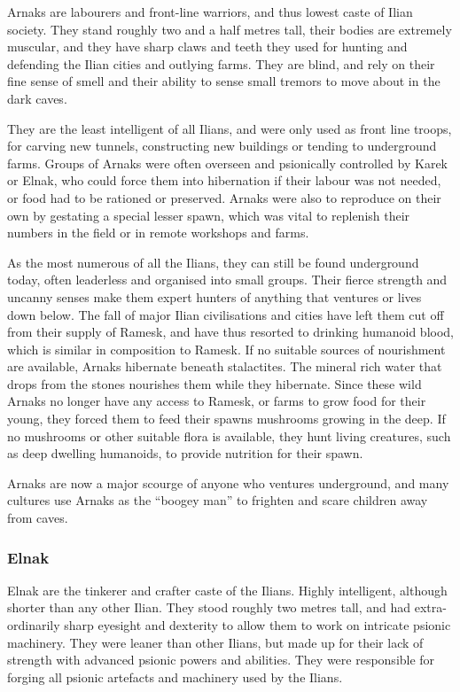 Arnaks are labourers and front-line warriors, and thus lowest caste of Ilian
society. They stand roughly two and a half metres tall, their bodies are
extremely muscular, and they have sharp claws and teeth they used for hunting
and defending the Ilian cities and outlying farms. They are blind, and rely on
their fine sense of smell and their ability to sense small tremors to move
about in the dark caves.

They are the least intelligent of all Ilians, and were only used as front line
troops, for carving new tunnels, constructing new buildings or tending to
underground farms. Groups of Arnaks were often overseen and psionically
controlled by Karek or Elnak, who could force them into hibernation if their
labour was not needed, or food had to be rationed or preserved. Arnaks were
also to reproduce on their own by gestating a special lesser spawn, which was
vital to replenish their numbers in the field or in remote workshops and
farms.

As the most numerous of all the Ilians, they can still be found underground
today, often leaderless and organised into small groups. Their fierce strength
and uncanny senses make them expert hunters of anything that ventures or lives
down below. The fall of major Ilian civilisations and cities have left them
cut off from their supply of Ramesk, and have thus resorted to drinking
humanoid blood, which is similar in composition to Ramesk. If no suitable
sources of nourishment are available, Arnaks hibernate beneath
stalactites. The mineral rich water that drops from the stones nourishes them
while they hibernate. Since these wild Arnaks no longer have any access to
Ramesk, or farms to grow food for their young, they forced them to feed their
spawns mushrooms growing in the deep. If no mushrooms or other suitable flora
is available, they hunt living creatures, such as deep dwelling humanoids, to
provide nutrition for their spawn.

Arnaks are now a major scourge of anyone who ventures underground, and many
cultures use Arnaks as the ``boogey man'' to frighten and scare children away
from caves.

\subsubsection{Elnak}
\label{sec:Elnak}

Elnak are the tinkerer and crafter caste of the Ilians. Highly intelligent,
although shorter than any other Ilian. They stood roughly two metres tall, and
had extra-ordinarily sharp eyesight and dexterity to allow them to work on
intricate psionic machinery. They were leaner than other Ilians, but made up
for their lack of strength with advanced psionic powers and abilities. They
were responsible for forging all psionic artefacts and machinery used by the
Ilians.

